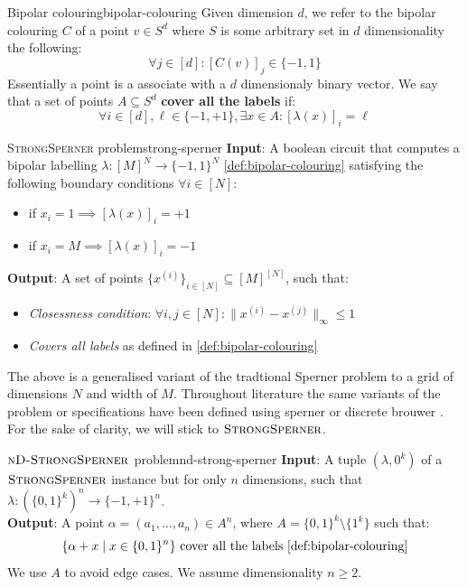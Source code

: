 \begin{definitionbox}{Bipolar colouring}{bipolar-colouring}
    Given dimension $d$, we refer to the bipolar colouring $C$ of a point $v \in S^d$
    where $S$ is some arbitrary set in $d$ dimensionality the following:
    $$
    \forall j \in [d]: [C(v)]_j \in \{-1,1\}
    $$
    Essentially a point is a associate with a $d$ dimensionaly binary vector.
    We say that a set of points $A \subseteq S^d$ \textbf{cover all the labels} if:
    $$
        \forall i \in [d], \ell \in \{-1, +1\}, \exists x \in A: [\lambda(x)]_{i} = \ell
    $$
\end{definitionbox}



\begin{definitionbox}{\textsc{StrongSperner} problem}{strong-sperner}
    \textbf{Input}: A boolean circuit that computes a bipolar labelling $\lambda: [M]^N \to \{-1, 1\}^N$ \ref{def:bipolar-colouring}
    satisfying the following boundary conditions $\forall i \in [N]$:
    \begin{itemize}
        \item if $x_i = 1 \implies [\lambda(x)]_i = +1$
        \item if $x_i = M \implies [\lambda(x)]_i = -1$
    \end{itemize}
    \textbf{Output}: A set of points $\{x^{(i)}\}_{i \in [N]} \subseteq [M]^{[N]}$, such that:
    \begin{itemize}
        \item \textit{Closessness condition}: $\forall i,j \in [N]: \|x^{(i)} - x^{(j)}\|_{\infty} \leq 1$
        \item \textit{Covers all labels} as defined in \ref{def:bipolar-colouring}
    \end{itemize}
\end{definitionbox}

The above is a generalised variant of the tradtional Sperner problem to
a grid of dimensions $N$ and width of $M$. 
Throughout literature the same variants of the problem or specifications
have been defined using sperner or discrete brouwer \cite{chen_SettlingComplexityComputing_2009, chen_Complexity2DDiscrete_2009, daskalakis_ComplexityComputingNash_2006, deligkas_PureCircuitTightInapproximability_2024}.
For the sake of clarity, we will stick to $\textsc{StrongSperner}$.

\begin{definitionbox}{$\textnormal{\textsc{nD-StrongSperner}}$ problem}{nd-strong-sperner}
    \textbf{Input}: A tuple $(\lambda,0^k)$ of a $\textnormal{\textsc{StrongSperner}}$ instance but for only $n$ dimensions, such that
    $\lambda : (\{0,1\}^k)^n \to \{-1, +1\}^n$.\\
    \textbf{Output}: A point $\alpha = (a_1, \hdots, a_n) \in A^n$, where $A=\{0,1\}^k \setminus \{1^k\}$ such that:
    $$
    \{\alpha + x \mid x \in \{0,1\}^n\} \text{ cover all the labels \ref{def:bipolar-colouring}}
    $$
    We use $A$ to avoid edge cases. We assume dimensionality $n \geq 2$.
\end{definitionbox}

